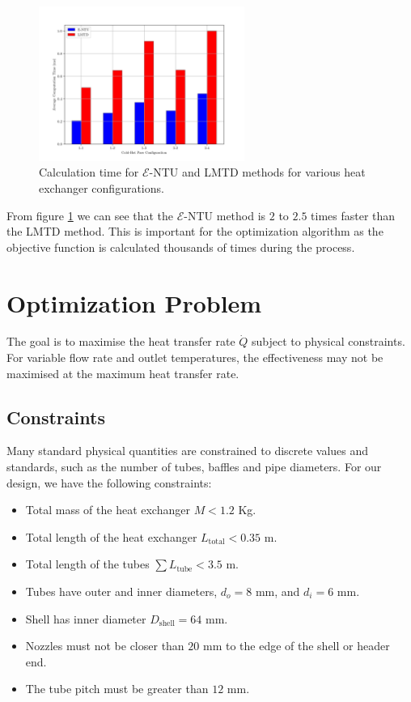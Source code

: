 \documentclass{article}
\begin{document}
\begin{figure}[H]
  \centering
  \includegraphics[width=0.6\textwidth]{entu_lmtd_speed.png}
  \caption{Calculation time for $\mathcal{E}$-NTU and LMTD methods for various heat exchanger configurations.}
  \label{fig:entu_lmtd_speed}
\end{figure}

From figure \ref{fig:entu_lmtd_speed} we can see that the $\mathcal{E}$-NTU method is $2$ to $2.5$ times faster than the LMTD method.
This is important for the optimization algorithm as the objective function is calculated thousands of times during the process.


\section{Optimization Problem}

The goal is to maximise the heat transfer rate $\dot{Q}$ subject to physical constraints. For variable flow rate and outlet temperatures, the effectiveness may not be maximised at the maximum heat transfer rate.

\subsection{Constraints}

Many standard physical quantities are constrained to discrete values and standards, such as the number of tubes, baffles and pipe diameters.
For our design, we have the following constraints:
\begin{itemize}
  \item Total mass of the heat exchanger $M < 1.2$ Kg.
  \item Total length of the heat exchanger $L_{\text{total}} < 0.35$ m.
  \item Total length of the tubes $\sum L_{\text{tube}} < 3.5$ m.
  \item Tubes have outer and inner diameters, $d_{o} = 8$ mm, and $d_{i} = 6$ mm.
  \item Shell has inner diameter $D_{\text{shell}} = 64$ mm.
  \item Nozzles must not be closer than $20$ mm to the edge of the shell or header end.
  \item The tube pitch must be greater than $12$ mm.
\end{itemize}
\end{document}
